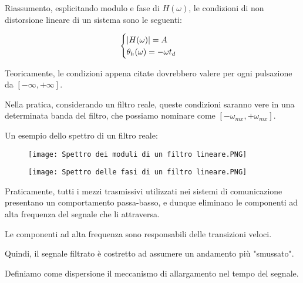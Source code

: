 Riassumento, esplicitando modulo e fase di $H(\omega)$, 
le condizioni di non distorsione lineare di un sistema  sono le seguenti: 

{
    \Large 
    \begin{equation}
        \begin{cases}
            \abs{H(\omega)} = A \\ 
            \theta_h (\omega) = -\omega t_d  
        \end{cases}
    \end{equation}
} 

Teoricamente, le condizioni appena citate dovrebbero valere per ogni pulsazione da 
$[-\infty, + \infty]$. \newline 

Nella pratica, considerando un filtro reale, queste condizioni saranno vere in una determinata banda del filtro, 
che possiamo nominare come $[-\omega_{mx}, +\omega_{mx}]$. \newline 

Un esempio dello spettro di un filtro reale: 

{
    \begin{figure}[h]
        \centering
        \texttt{[image: Spettro dei moduli di un filtro lineare.PNG]}
    \end{figure}  
     
}


{
    \begin{figure}[h]
        \centering
        \texttt{[image: Spettro delle fasi di un filtro lineare.PNG]}
    \end{figure}  
     
} 

\newpage  


Praticamente, tutti i mezzi trasmissivi utilizzati nei sistemi di comunicazione presentano 
un comportamento passa-basso, e dunque eliminano le componenti ad alta frequenza del segnale che li attraversa. \newline 

Le componenti ad alta frequenza sono responsabili delle transizioni veloci. \newline 

Quindi, il segnale filtrato è costretto ad assumere un andamento più "smussato". \newline 

Definiamo come dispersione il meccanismo di allargamento nel tempo del segnale. \newline 

